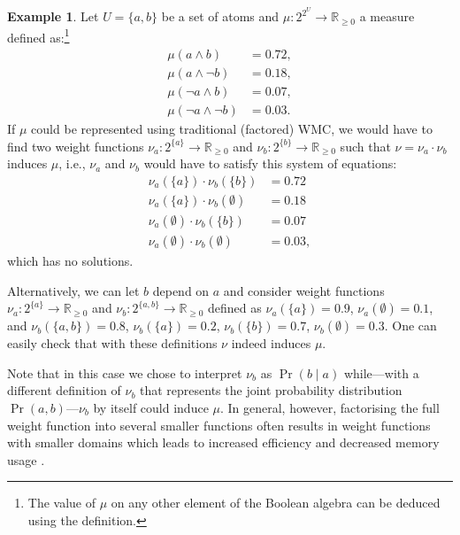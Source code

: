 \documentclass{article}
\theoremstyle{definition}
\newtheorem{example}{Example}
\theoremstyle{remark}
\begin{document}
{\begin{example}
  Let $U = \{a, b\}$ be a set of atoms and $\mu\colon 2^{2^U} \to
  \mathbb{R}_{\ge 0}$ a measure defined as:\footnote{The value of $\mu$ on any
    other element of the Boolean algebra can be deduced using the definition.}
  \begin{align*}
    \mu(a \land b) &= 0.72, \\
    \mu(a \land \neg b) &= 0.18, \\
    \mu(\neg a \land b) &= 0.07, \\
    \mu(\neg a \land \neg b) &= 0.03.
  \end{align*}
  If $\mu$ could be represented using traditional (factored) WMC, we would have
  to find two weight functions $\nu_a\colon 2^{\{a\}} \to \mathbb{R}_{\ge 0}$
  and $\nu_b\colon 2^{\{b\}} \to \mathbb{R}_{\ge 0}$ such that $\nu = \nu_a
  \cdot \nu_b$ induces $\mu$, i.e., $\nu_a$ and $\nu_b$ would have to satisfy
  this system of equations:
  \begin{align*}
    \nu_a(\{a\}) \cdot \nu_b(\{b\}) &= 0.72 \\
    \nu_a(\{a\}) \cdot \nu_b(\emptyset) &= 0.18 \\
    \nu_a(\emptyset) \cdot \nu_b(\{b\}) &= 0.07 \\
    \nu_a(\emptyset) \cdot \nu_b(\emptyset) &= 0.03,
  \end{align*}
  which has no solutions.

  Alternatively, we can let $b$ depend on $a$ and consider weight functions
  $\nu_a\colon 2^{\{a\}} \to \mathbb{R}_{\ge 0}$ and $\nu_b\colon 2^{\{a, b\}}
  \to \mathbb{R}_{\ge 0}$ defined as $\nu_a(\{a\}) = 0.9$, $\nu_a(\emptyset) =
  0.1$, and $\nu_b(\{a, b\}) = 0.8$, $\nu_b(\{a\}) = 0.2$, $\nu_b(\{b\}) = 0.7$,
  $\nu_b(\emptyset) = 0.3$. One can easily check that with these definitions
  $\nu$ indeed induces $\mu$.
\end{example}

Note that in this case we chose to interpret $\nu_b$ as $\Pr(b \mid a)$
while---with a different definition of $\nu_b$ that represents the joint
probability distribution $\Pr(a, b)$---$\nu_b$ by itself could induce $\mu$. In
general, however, factorising the full weight function into several smaller
functions often results in weight functions with smaller domains which leads to
increased efficiency and decreased memory usage \cite{DBLP:conf/aaai/DudekPV20}.


}
\end{document}
